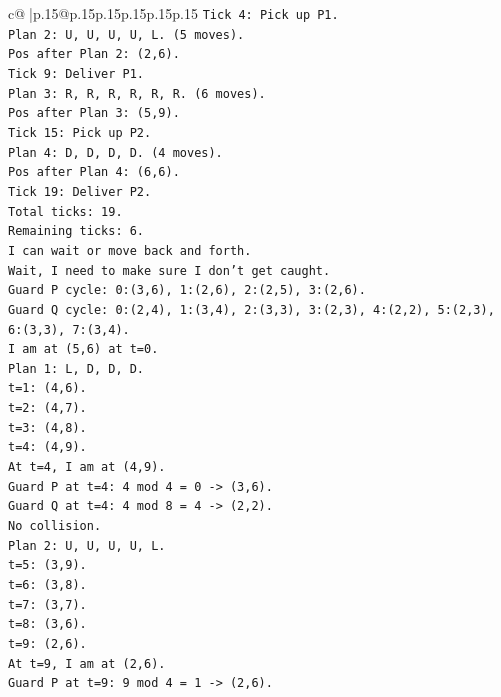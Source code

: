 \documentclass{article}
\begin{document}
{\begin{supertabular}{c@{$\;$}|p{.15\linewidth}@{}p{.15\linewidth}p{.15\linewidth}p{.15\linewidth}p{.15\linewidth}p{.15\linewidth}}
{{{\texttt{Tick 4: Pick up P1.} \\
\texttt{Plan 2: U, U, U, U, L. (5 moves).} \\
\texttt{Pos after Plan 2: (2,6).} \\
\texttt{Tick 9: Deliver P1.} \\
\texttt{Plan 3: R, R, R, R, R, R. (6 moves).} \\
\texttt{Pos after Plan 3: (5,9).} \\
\texttt{Tick 15: Pick up P2.} \\
\texttt{Plan 4: D, D, D, D. (4 moves).} \\
\texttt{Pos after Plan 4: (6,6).} \\
\texttt{Tick 19: Deliver P2.} \\
\texttt{Total ticks: 19.} \\
\texttt{Remaining ticks: 6.} \\
\texttt{I can wait or move back and forth.} \\
\texttt{Wait, I need to make sure I don't get caught.} \\
\texttt{Guard P cycle: 0:(3,6), 1:(2,6), 2:(2,5), 3:(2,6).} \\
\texttt{Guard Q cycle: 0:(2,4), 1:(3,4), 2:(3,3), 3:(2,3), 4:(2,2), 5:(2,3), 6:(3,3), 7:(3,4).} \\
\texttt{I am at (5,6) at t=0.} \\
\texttt{Plan 1: L, D, D, D.} \\
\texttt{t=1: (4,6).} \\
\texttt{t=2: (4,7).} \\
\texttt{t=3: (4,8).} \\
\texttt{t=4: (4,9).} \\
\texttt{At t=4, I am at (4,9).} \\
\texttt{Guard P at t=4: 4 mod 4 = 0 {-}> (3,6).} \\
\texttt{Guard Q at t=4: 4 mod 8 = 4 {-}> (2,2).} \\
\texttt{No collision.} \\
\texttt{Plan 2: U, U, U, U, L.} \\
\texttt{t=5: (3,9).} \\
\texttt{t=6: (3,8).} \\
\texttt{t=7: (3,7).} \\
\texttt{t=8: (3,6).} \\
\texttt{t=9: (2,6).} \\
\texttt{At t=9, I am at (2,6).} \\
\texttt{Guard P at t=9: 9 mod 4 = 1 {-}> (2,6).} \\
}}}
\end{supertabular}}
\end{document}
